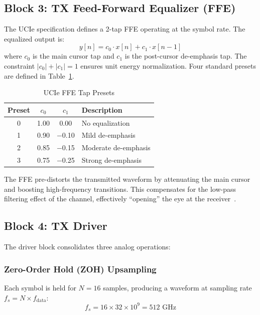\documentclass[conference]{IEEEtran}
\begin{document}
\subsection{Block 3: TX Feed-Forward Equalizer (FFE)}

The UCIe specification defines a 2-tap FFE operating at the symbol rate. The equalized output is:
\begin{equation}
    y[n] = c_0 \cdot x[n] + c_1 \cdot x[n-1]
\end{equation}
where $c_0$ is the main cursor tap and $c_1$ is the post-cursor de-emphasis tap. The constraint $|c_0| + |c_1| = 1$ ensures unit energy normalization. Four standard presets are defined in Table~\ref{tab:presets}.

\begin{table}[h]
\caption{UCIe FFE Tap Presets}
\label{tab:presets}
\centering
\begin{tabular}{|c|c|c|l|}
\hline
\textbf{Preset} & $c_0$ & $c_1$ & \textbf{Description} \\
\hline
0 & 1.00 & 0.00 & No equalization \\
1 & 0.90 & $-$0.10 & Mild de-emphasis \\
2 & 0.85 & $-$0.15 & Moderate de-emphasis \\
3 & 0.75 & $-$0.25 & Strong de-emphasis \\
\hline
\end{tabular}
\end{table}

The FFE pre-distorts the transmitted waveform by attenuating the main cursor and boosting high-frequency transitions. This compensates for the low-pass filtering effect of the channel, effectively ``opening'' the eye at the receiver~\cite{proakis2008}.

\subsection{Block 4: TX Driver}

The driver block consolidates three analog operations:

\subsubsection{Zero-Order Hold (ZOH) Upsampling}
Each symbol is held for $N = 16$ samples, producing a waveform at sampling rate $f_s = N \times f_{\text{data}}$:
\begin{equation}
    f_s = 16 \times 32 \times 10^9 = 512 \text{ GHz}
\end{equation}
\end{document}
